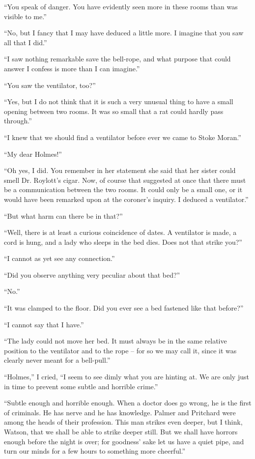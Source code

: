 “You speak of danger. You have evidently seen more in
these rooms than was visible to me.”

“No, but I fancy that I may have deduced a little more.
I imagine that you saw all that I did.”

“I saw nothing remarkable save the bell-rope, and what
purpose that could answer I confess is more than I can
imagine.”

“You saw the ventilator, too?”

“Yes, but I do not think that it is such a very unusual thing
to have a small opening between two rooms. It was so small
that a rat could hardly pass through.”

“I knew that we should find a ventilator before ever we
came to Stoke Moran.”

“My dear Holmes!”

“Oh yes, I did. You remember in her statement she said
that her sister could smell Dr. Roylott’s cigar. Now, of course
that suggested at once that there must be a communication
between the two rooms. It could only be a small one, or it
would have been remarked upon at the coroner’s inquiry. I
deduced a ventilator.”

“But what harm can there be in that?”

“Well, there is at least a curious coincidence of dates. A
ventilator is made, a cord is hung, and a lady who sleeps in
the bed dies. Does not that strike you?”

“I cannot as yet see any connection.”

“Did you observe anything very peculiar about that bed?”

“No.”

“It was clamped to the floor. Did you ever see a bed
fastened like that before?”

“I cannot say that I have.”

“The lady could not move her bed. It must always be in
the same relative position to the ventilator and to the rope --
for so we may call it, since it was clearly never meant for a
bell-pull.”

“Holmes,” I cried, “I seem to see dimly what you are
hinting at. We are only just in time to prevent some subtle
and horrible crime.”

“Subtle enough and horrible enough. When a doctor
does go wrong, he is the first of criminals. He has nerve
and he has knowledge. Palmer and Pritchard were among
the heads of their profession. This man strikes even deeper,
but I think, Watson, that we shall be able to strike deeper
still. But we shall have horrors enough before the night is
over; for goodness’ sake let us have a quiet pipe, and turn
our minds for a few hours to something more cheerful.”


